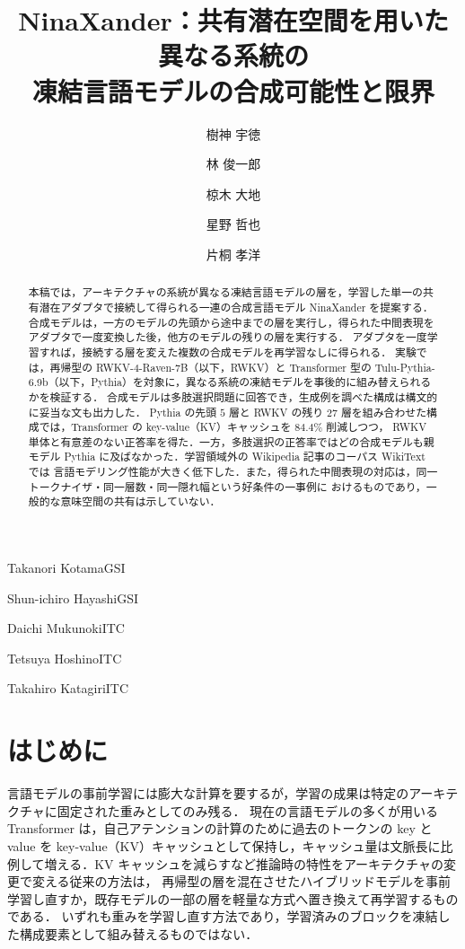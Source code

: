 \documentclass[techrep,noauthor]{ipsj}
\newcommand{\kw}[1]{#1}
\begin{document}
\title{NinaXander：共有潜在空間を用いた異なる系統の\\凍結言語モデルの合成可能性と限界}


\author{樹神 宇徳}{Takanori Kotama}{GSI}
\author{林 俊一郎}{Shun-ichiro Hayashi}{GSI}
\author{椋木 大地}{Daichi Mukunoki}{ITC}
\author{星野 哲也}{Tetsuya Hoshino}{ITC}
\author{片桐 孝洋}{Takahiro Katagiri}{ITC}

\begin{abstract}
本稿では，アーキテクチャの系統が異なる凍結言語モデルの層を，学習した単一の共有潜在アダプタで接続して得られる一連の合成言語モデル \kw{NinaXander} を提案する．
合成モデルは，一方のモデルの先頭から途中までの層を実行し，得られた中間表現をアダプタで一度変換した後，他方のモデルの残りの層を実行する．
アダプタを一度学習すれば，接続する層を変えた複数の合成モデルを再学習なしに得られる．
実験では，再帰型の RWKV-4-Raven-7B（以下，RWKV）と Transformer 型の Tulu-Pythia-6.9b（以下，Pythia）を対象に，異なる系統の凍結モデルを事後的に組み替えられるかを検証する．
合成モデルは多肢選択問題に回答でき，生成例を調べた構成は構文的に妥当な文も出力した．
Pythia の先頭 $5$ 層と RWKV の残り $27$ 層を組み合わせた構成では，Transformer の key-value（KV）キャッシュを $84.4\%$ 削減しつつ，
RWKV 単体と有意差のない正答率を得た．一方，多肢選択の正答率ではどの合成モデルも親モデル Pythia に及ばなかった．学習領域外の Wikipedia 記事のコーパス WikiText では
言語モデリング性能が大きく低下した．また，得られた中間表現の対応は，同一トークナイザ・同一層数・同一隠れ幅という好条件の一事例に
おけるものであり，一般的な意味空間の共有は示していない．
\end{abstract}

\maketitle

\section{はじめに}\label{sec:intro}
言語モデルの事前学習には膨大な計算を要するが，学習の成果は特定のアーキテクチャに固定された重みとしてのみ残る．
現在の言語モデルの多くが用いる Transformer は，自己アテンションの計算のために過去のトークンの key と value を
key-value（KV）キャッシュとして保持し，キャッシュ量は文脈長に比例して増える．KV キャッシュを減らすなど推論時の特性をアーキテクチャの変更で変える従来の方法は，
再帰型の層を混在させたハイブリッドモデルを事前学習し直すか，既存モデルの一部の層を軽量な方式へ置き換えて再学習するものである．
いずれも重みを学習し直す方法であり，学習済みのブロックを凍結した構成要素として組み替えるものではない．
\end{document}
